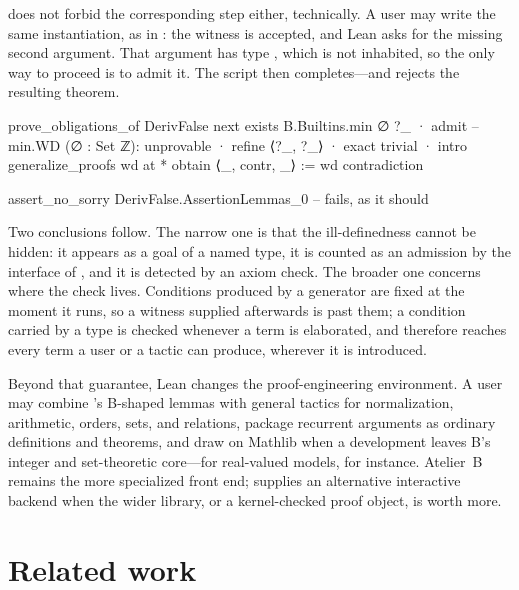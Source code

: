 \barrel{} does not forbid the corresponding step either, technically.
A user may write the same instantiation, as in : the
witness  is accepted, and Lean asks for the missing
second argument.
That argument has type , which is not
inhabited, so the only way to proceed is to admit it.
The script then completes---and  rejects the resulting theorem.

\begin{leanlisting}[title={The same instantiation in \barrel{}.},
    label={lst:barrel-derive-false-lean}]
prove_obligations_of DerivFalse
next
  exists B.Builtins.min ∅ ?_
  · admit -- min.WD (∅ : Set ℤ): unprovable
  · refine ⟨?_, ?_⟩
    · exact trivial
    · intro
      generalize_proofs wd at *
      obtain ⟨_, contr, _⟩ := wd
      contradiction

assert_no_sorry DerivFalse.AssertionLemmas_0   -- fails, as it should
\end{leanlisting}

Two conclusions follow.
The narrow one is that the ill-definedness cannot be hidden: it appears as a goal of a
named type, it is counted as an admission by the interface of
, and it is detected by an axiom check.
The broader one concerns where the check lives.
Conditions produced by a generator are fixed at the moment it runs, so a witness supplied
afterwards is past them; a condition carried by a type is checked whenever a term is
elaborated, and therefore reaches every term a user or a tactic can produce, wherever it is
introduced.

Beyond that guarantee, Lean changes the proof-engineering environment.
A user may combine \barrel{}'s B-shaped lemmas with general tactics for normalization,
arithmetic, orders, sets, and relations, package recurrent arguments as ordinary
definitions and theorems, and draw on Mathlib when a development leaves B's integer and
set-theoretic core---for real-valued models, for instance.
Atelier~B remains the more specialized front end; \barrel{} supplies an alternative
interactive backend when the wider library, or a kernel-checked proof object, is worth
more.

\section{Related work}
\label{sec:barrel-related-work}

